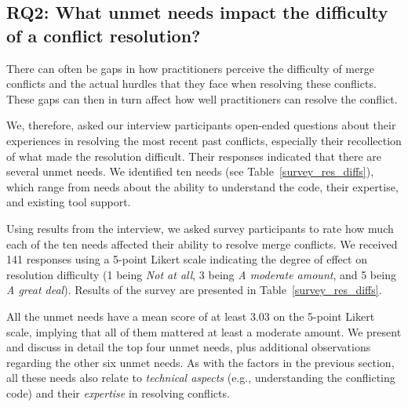 \subsection{\textbf{RQ2:} What unmet needs impact the difficulty of a conflict resolution?}\label{RQ2}

There can often be gaps in how practitioners perceive the difficulty of merge conflicts and the actual hurdles that they face when resolving these conflicts. 
These gaps can then in turn affect how well practitioners can resolve the conflict.

We, therefore, asked our interview participants open-ended questions about their experiences in resolving the most recent past conflicts, especially their recollection of what made the resolution difficult.
Their responses indicated that there are several unmet needs. We identified ten needs (see Table~\ref{survey_res_diffs}), which range from needs about the ability to understand the code, their expertise, and existing tool support.  

Using results from the interview, we asked survey participants to rate how much each of the ten needs affected their ability to resolve merge conflicts.
We received 141 responses using a 5-point Likert scale indicating the degree of effect on resolution difficulty (1 being \textit{Not at all}, 3 being \textit{A moderate amount}, and 5 being \textit{A great deal}).
Results of the survey are presented in Table~\ref{survey_res_diffs}. 

All the unmet needs have a mean score of at least $3.03$ on the 5-point Likert scale, implying that all of them mattered at least a moderate amount.
We present and discuss in detail the top four unmet needs, plus additional observations regarding the other six unmet needs. 
As with the factors in the previous section, all these needs also relate to \textit{technical aspects} (e.g., understanding the conflicting code) and their \textit{expertise} in resolving conflicts.


